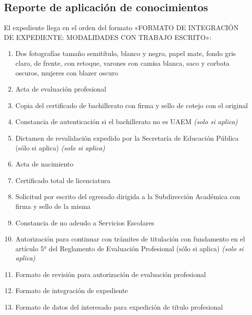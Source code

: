 \subsection{Reporte de aplicación de conocimientos}
El expediente llega en el orden del formato «FORMATO DE INTEGRACIÓN DE EXPEDIENTE: MODALIDADES CON TRABAJO ESCRITO»:
\begin{enumerate}
  \item Dos fotografías tamaño semitítulo, blanco y negro, papel mate, fondo gris claro, de frente, con retoque, varones con camisa blanca, saco y corbata oscuros, mujeres con blazer oscuro
  \item Acta de evaluación profesional
  \item Copia del certificado de bachillerato con firma y sello de cotejo con el original
  \item Constancia de autenticación si el bachillerato no es UAEM \emph{(solo si aplica)}
  \item Dictamen de revalidación expedido por la Secretaría de Educación Pública (sólo si aplica) \emph{(solo si aplica)}
  \item Acta de nacimiento
  \item Certificado total de licenciatura
  \item Solicitud por escrito del egresado dirigida a la Subdirección Académica con firma y sello de la misma
  \item Constancia de no adeudo a Servicios Escolares
  \item Autorización para continuar con trámites de titulación con fundamento en el artículo 5° del Reglamento de Evaluación Profesional (sólo si aplica) \emph{(solo si aplica)}
  \item Formato de revisión para autorización de evaluación profesional
  \item Formato de integración de expediente
  \item Formato de datos del interesado para expedición de título profesional
\end{enumerate}
